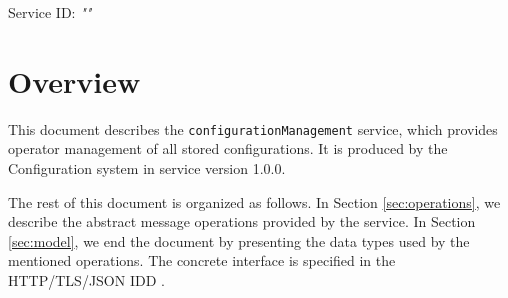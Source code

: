 \documentclass[a4paper]{arrowhead}
\begin{document}
\sloppy

\ArrowheadSetup

\begin{center}
  \vspace*{1cm}
  \huge{\arrowtitle}

  \vspace*{0.2cm}
  \LARGE{\arrowtype}
  \vspace*{1cm}

  \Large{Service ID: \textit{"\arrowid"}}

  \vspace*{\fill}


  \vspace*{1cm}
  \vspace*{\fill}

  \begin{abstract}
    This document describes the \texttt{configuration\allowbreak{}Management} service, version 1.0.0, produced by the Configuration support system of Arrowhead 5.2.2.
  \end{abstract}

  \vspace*{1cm}
\end{center}

\newpage

\tableofcontents
\newpage

\section{Overview}
\label{sec:overview}

This document describes the \texttt{configuration\allowbreak{}Management} service, which provides operator management of all stored configurations.
It is produced by the Configuration system \cite{cfg-sysd} in service version 1.0.0.

The rest of this document is organized as follows.
In Section \ref{sec:operations}, we describe the abstract message operations provided by the service.
In Section \ref{sec:model}, we end the document by presenting the data types used by the mentioned operations.
The concrete interface is specified in the HTTP/TLS/JSON IDD \cite{cfg-configurationManagement-http-idd}.
\end{document}

